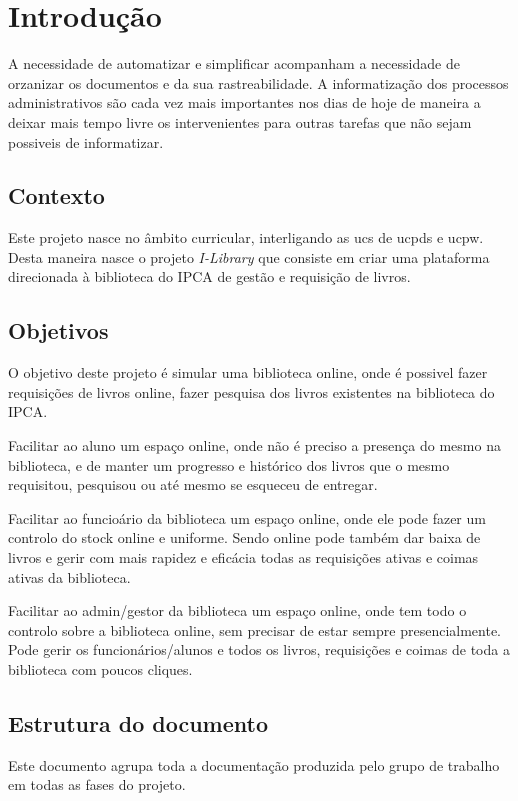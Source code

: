 
\chapter{Introdução}

A necessidade de automatizar e simplificar acompanham a necessidade de orzanizar os documentos e da sua rastreabilidade. A informatização dos processos administrativos são cada vez mais importantes nos dias de hoje de maneira a deixar mais tempo livre os intervenientes para outras tarefas que não sejam possiveis de informatizar. 

\section{Contexto}

Este projeto nasce no âmbito curricular, interligando as \acrshort{ucs} de \acrshort{ucpds} e \acrshort{ucpw}. Desta maneira nasce o projeto \textit{I-Library} que consiste em criar uma plataforma direcionada à biblioteca do IPCA de gestão e requisição de livros. 


\section{Objetivos}

O objetivo deste projeto é simular uma biblioteca online, onde é possivel fazer requisições de livros online, fazer pesquisa dos livros existentes na biblioteca do IPCA.

Facilitar ao aluno um espaço online, onde não é preciso a presença do mesmo na biblioteca, e de manter um progresso e histórico dos livros que o mesmo requisitou, pesquisou ou até mesmo se esqueceu de entregar.

Facilitar ao funcioário da biblioteca um espaço online, onde ele pode fazer um controlo do stock online e uniforme. Sendo online pode também dar baixa de livros e gerir com mais rapidez e eficácia todas as requisições ativas e coimas ativas da biblioteca.

Facilitar ao admin/gestor da biblioteca um espaço online, onde tem todo o controlo sobre a biblioteca online, sem precisar de estar sempre presencialmente. Pode gerir os funcionários/alunos e todos os livros, requisições e coimas de toda a biblioteca com poucos cliques.

\clearpage

\section{Estrutura do documento}
Este documento agrupa toda a documentação produzida pelo grupo de trabalho em todas as fases do projeto.

